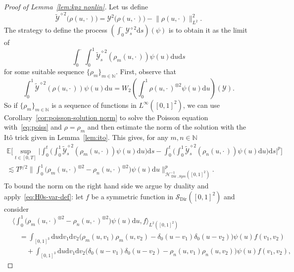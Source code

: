 \documentclass[AHL,Unicode,longabstracts]{cedram}
\DeclareMathOperator{\Dir}{Dir}
\newcommand{\bb}[1]{{\mathbb #1}}
\newcommand{\mc}[1]{{\mathcal #1}}
\renewcommand{\mc}[1]{{\mathcal #1}}
\newcommand{\SD}{\ensuremath{\mc S_{\Dir}}}
\newcommand*{\dd}{\mathrm{d}}
\newcommand*{\ds}{\dd s}
\newcommand*{\du}{\dd u}
\newcommand*{\dv}{\dd v}
\begin{document}
\begin{proof}[Proof of Lemma~\ref{lem:kpz nonlin}]
Let us define
\[
\widetilde{\mc Y}^{\diamond 2}\big(\rho(u,\cdot\,)\big) = \mc Y^2 \big(\rho (u, \cdot\,)\big) - \big\| \rho (u, \cdot\,) \big\|_{L^2}^2.
\]
The strategy to define the process $(\int_0^\cdot \mc Y_s^{\diamond 2} \ds)(\psi)$ is to obtain it as the limit of
\begin{equation}\label{eq:sequence}
\int_0^\cdot \int_0^1\widetilde{\mc Y}_s^{\diamond 2}(\rho_m(u,\cdot\,))\psi(u)\du \ds
\end{equation}
for some suitable sequence $\{\rho_m\}_{m \in \bb N}$. First, observe that
\begin{equation}\label{eq:poiss}
\int_0^1 \widetilde{\mc Y}^{\diamond 2} (\rho (u, \cdot\,)) \psi (u) \du = W_2
\left(\int_0^1 \rho (u, \cdot\,)^{\otimes 2} \psi (u) \du
\right) (\mc Y).
\end{equation}
So if $\{\rho_m\}_{m \in\mathbb{N}}$ is a sequence of functions in $L^{\infty} ([0, 1]^2)$, we can use Corollary~\ref{cor:poisson-solution norm} to solve the Poisson equation with~\eqref{eq:poiss} and $\rho=\rho_m$ and then estimate the norm of the solution with the It\^o trick given in Lemma~\ref{lem:ito}. This gives, for any $m, n \in \mathbb{N}$
\begin{multline*}
\mathbb{E} \bigg[\sup_{t \in [0, T]} \bigg| \int_0^t \bigg(\int_0^1
\widetilde{\mc Y}^{\diamond 2}_s (\rho_m (u, \cdot\,)) \psi (u) \du \bigg) \ds - \int_0^t \bigg(\int_0^1 \widetilde{\mc Y}^{\diamond 2}_s (\rho_n (u, \cdot\,)) \psi (u) \du \bigg) \ds \bigg|^p \bigg]\\
 \lesssim T^{p / 2} \bigg\| \int_0^1 \big(\rho_m (u, \cdot\,)^{\otimes 2} -
\rho_n(u, \cdot\,)^{\otimes 2} \big) \psi (u) \du \bigg\|_{\mc H^{- 1}_{\Dir, Sym} ([0, 1]^2)}^p.
\end{multline*}
To bound the norm on the right hand side we argue by duality and apply~\eqref{eq:H0s-var-def}: let $f$ be a symmetric function in $\SD ([0, 1]^2)$ and consider
\begin{align*}
&\bigg\langle \int_0^1 \big(\rho_m (u, \cdot\,)^{\otimes 2} - \rho_n (u, \cdot\,)^{\otimes 2}\big) \psi (u) \du, f \bigg\rangle_{L^2 ([0, 1]^2)}\\
&\quad = \int_{[0, 1]^3} \du \dv_1 \dv_2 \big(\rho_m (u, v_1) \rho_m (u, v_2) - \delta_0(u - v_1) \delta_0(u - v_2)\big) \psi (u) f (v_1, v_2)\\
&\qquad+ \int_{[0, 1]^3} \du \dv_1 \dv_2 \big(\delta_0(u - v_1) \delta_0 (u - v_2) - \rho_n (u, v_1) \rho_n (u, v_2)\big) \psi (u) f (v_1, v_2),

\end{align*}
\end{proof}
\end{document}
